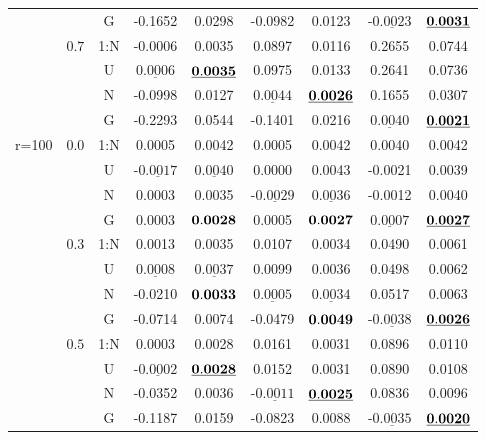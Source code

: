 \documentclass[12pt]{article}
\newcommand{\ul}{\underline}
\begin{document}
\begin{table}[htp!]
\begin{center}
{\begin{tabular}{|c|c|c|c|c|c|c|c|c| }
&		   &G&    -0.1652  & 0.0298    & -0.0982  & 0.0123 &-$\ul{0.0023}$  &${\bf\ul{0.0031}}$  \\
		         \cline{2-9}		
&		 $0.7$&1:N&    -0.0006  & 0.0035    & 0.0897  & 0.0116 & 0.2655  & 0.0744    \\
&		   &U&$\ul{0.0006}$  &${\bf\ul{0.0035}}$  & 0.0975  & 0.0133 & 0.2641  & 0.0736    \\
&		   &N&    -0.0998  & 0.0127    &$\ul{0.0044}$  &${\bf\ul{0.0026}}$ & 0.1655  & 0.0307    \\
&		   &G&    -0.2293  & 0.0544    & -0.1401  & 0.0216 &$\ul{0.0040}$  &${\bf\ul{0.0021}}$ \\
\hline
\multirow{15}{1cm}{r=100}&   $0.0$&1:N&    0.0005  & 0.0042     & 0.0005  & 0.0042  & 0.0040  & 0.0042     \\
	 &	   &U&-$\ul{0.0017}$  &$\ul{0.0040}$     & 0.0000  & 0.0043 & -0.0021  & 0.0039     \\
	&	   &N&    0.0003  & 0.0035     &-$\ul{0.0029}$  &$\ul{0.0036}$ & -0.0012  & 0.0040     \\
	&	   &G&    0.0003  &${\bf 0.0028}$     & 0.0005  &${\bf 0.0027}$ &$\ul{0.0007}$  &${\bf\ul{0.0027}}$     \\
                \cline{2-9}
   &      $0.3$&1:N&    0.0013  & 0.0035  & 0.0107  & 0.0034 & 0.0490  & 0.0061    \\
	&	   &U&$\ul{0.0008}$  &$\ul{0.0037}$  &0.0099  &0.0036 & 0.0498  & 0.0062    \\
	&	   &N&    -0.0210  &${\bf 0.0033}$  &$\ul{ 0.0005}$  &$\ul{ 0.0034}$ & 0.0517  & 0.0063    \\
&		   &G&    -0.0714  & 0.0074  & -0.0479  &${\bf 0.0049}$ &-$\ul{0.0038}$  &${\bf\ul{ 0.0026}}$ \\
		        \cline{2-9}
 &		 $0.5$&1:N&    0.0003  & 0.0028    & 0.0161  & 0.0031 & 0.0896  & 0.0110    \\
&		   &U&-$\ul{0.0002}$  &${\bf\ul{ 0.0028}}$  & 0.0152  & 0.0031 & 0.0890  & 0.0108    \\
&		   &N&    -0.0352  & 0.0036    &-$\ul{0.0011}$  &${\bf\ul{ 0.0025}}$ & 0.0836  & 0.0096    \\
&		   &G&    -0.1187  & 0.0159    & -0.0823  & 0.0088 &-$\ul{0.0035}$  &${\bf\ul{ 0.0020}}$  \\

\end{tabular}}
\end{center}
\end{table}
\end{document}
